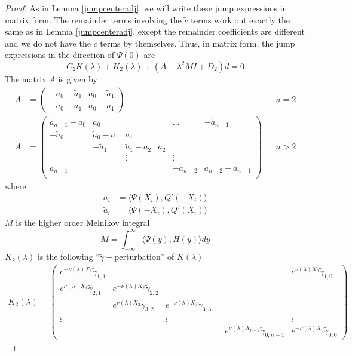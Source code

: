 \documentclass[thesis.tex]{subfiles}
\begin{document}
\begin{lemma}
\begin{proof}
As in Lemma \ref{jumpcenteradj}, we will write these jump expressions in matrix form. The remainder terms involving the $\tilde{c}$ terms work out exactly the same as in Lemma \ref{jumpcenteradj}, except the remainder coefficients are different and we do not have the $\tilde{c}$ terms by themselves. Thus, in matrix form, the jump expressions in the direction of $\Psi(0)$ are
\[
C_2 K(\lambda) + K_2(\lambda) + (A - \lambda^2 M I + D_2)d = 0
\]
The matrix $A$ is given by
\begin{align*}
A &= \begin{pmatrix}
-a_0 + \tilde{a}_1 & a_0 - \tilde{a}_1 \\
-\tilde{a}_0 + a_1 & \tilde{a}_0 - a_1
\end{pmatrix} && n = 2 \\
A &= \begin{pmatrix}
\tilde{a}_{n-1} - a_0 & a_0 & & & \dots & -\tilde{a}_{n-1}\\
-\tilde{a}_0 & \tilde{a}_0 - a_1 &  a_1 \\
& -\tilde{a}_1 & \tilde{a}_1 - a_2 &  a_2 \\
& & \vdots & & \vdots \\
a_{n-1} & & & & -\tilde{a}_{n-2} & \tilde{a}_{n-2} - a_{n-1} \\
\end{pmatrix} && n > 2
\end{align*}
where
\begin{align*}
a_i &= \langle \Psi(X_i), Q'(-X_i) \rangle \\
\tilde{a}_i &= \langle \Psi(-X_i), Q'(X_i) \rangle
\end{align*}
$M$ is the higher order Melnikov integral
\[
M = \int_{-\infty}^\infty \langle \Psi(y), H(y) \rangle dy
\]
$K_2(\lambda)$ is the following ``$\tilde{\gamma}-$perturbation'' of $K(\lambda)$ 
\begin{align*}
K_2(\lambda) =  
\begin{pmatrix}
e^{-\nu(\lambda)X_1} \tilde{\gamma}_{1,1} & & & & & e^{\nu(\lambda)X_0}\tilde{\gamma}_{1,0} \\
e^{\nu(\lambda)X_1}\tilde{\gamma}_{2,1} & e^{-\nu(\lambda)X_2}\tilde{\gamma}_{2,2} \\
& e^{\nu(\lambda)X_2}\tilde{\gamma}_{3,2} & e^{-\nu(\lambda)X_3}\tilde{\gamma}_{3,3} \\
\vdots & & \vdots & &&  \vdots \\
& & & & e^{\nu(\lambda)X_{n-1}}\tilde{\gamma}_{0,n-1} & e^{-\nu(\lambda)X_0}\tilde{\gamma}_{0,0} 
\end{pmatrix}

\end{align*}
\end{proof}
\end{lemma}
\end{document}
